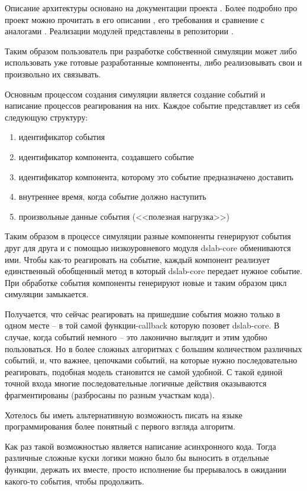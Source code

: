 Описание архитектуры основано на документации проекта \cite{dslab-architecture}. Более подробно про проект можно прочитать в его описании \cite{dslab-description}, его требования \cite{dslab-requirements} и сравнение с аналогами \cite{dslab-analog-cmp}. Реализации модулей представлены в репозитории \cite{dslab-repo}.

Таким образом пользователь при разработке собственной симуляции может либо использовать уже готовые разработанные компоненты, либо реализовывать свои и произвольно их связывать. 


Основным процессом создания симуляции является создание событий и написание процессов реагирования на них. Каждое событие представляет из себя следующую структуру: 
\begin{enumerate}
    \item идентификатор события 
    \item идентификатор компонента, создавшего событие 
    \item идентификатор компонента, которому это событие предназначено доставить 
    \item внутреннее время, когда событие должно наступить
    \item произвольные данные события (<<полезная нагрузка>>)
\end{enumerate}

Таким образом в процессе симуляции разные компоненты генерируют события друг для друга и с помощью низкоуровневого модуля dslab-core обмениваются ими. Чтобы как-то реагировать на событие, каждый компонент реализует единственный обобщенный метод в который dslab-core передает нужное событие. При обработке события компоненты генерируют новые и таким образом цикл симуляции замыкается. 

Получается, что сейчас реагировать на пришедшие события можно только в одном месте -- в той самой функции-callback которую позовет dslab-core. В случае, когда событий немного -- это лаконично выглядит и этим удобно пользоваться. Но в более сложных алгоритмах с большим количеством различных событий, и, что важнее, цепочками событий, на которые нужно последовательно реагировать, подобная модель становится не самой удобной. С такой единой точной входа многие последовательные логичные действия оказываются фрагментированы (разбросаны по разным участкам кода). 

Хотелось бы иметь альтернативную возможность писать на языке программирования более понятный с первого взгляда алгоритм.

Как раз такой возможностью является написание асинхронного кода. Тогда различные сложные куски логики можно было бы выносить в отдельные функции, держать их вместе, просто исполнение бы прерывалось в ожидании какого-то события, чтобы продолжить.

